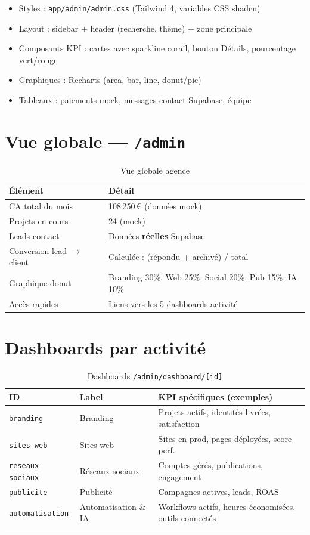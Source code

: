 \documentclass[11pt,a4paper]{report}
\begin{document}
\begin{itemize}[leftmargin=*]
  \item Styles : \texttt{app/admin/admin.css} (Tailwind 4, variables CSS shadcn)
  \item Layout : sidebar + header (recherche, thème) + zone principale
  \item Composants KPI : cartes avec sparkline corail, bouton Détails, pourcentage vert/rouge
  \item Graphiques : Recharts (area, bar, line, donut/pie)
  \item Tableaux : paiements mock, messages contact Supabase, équipe
\end{itemize}

\section{Vue globale — \texttt{/admin}}

\begin{table}[h]
\centering
\begin{tabular}{@{}lp{9cm}@{}}
\toprule
\textbf{Élément} & \textbf{Détail} \\
\midrule
CA total du mois & 108\,250\,€ (données mock) \\
Projets en cours & 24 (mock) \\
Leads contact & Données \textbf{réelles} Supabase \\
Conversion lead $\rightarrow$ client & Calculée : (répondu + archivé) / total \\
Graphique donut & Branding 30\%, Web 25\%, Social 20\%, Pub 15\%, IA 10\% \\
Accès rapides & Liens vers les 5 dashboards activité \\
\bottomrule
\end{tabular}
\caption{Vue globale agence}
\end{table}

\section{Dashboards par activité}

\begin{longtable}{@{}llp{7cm}@{}}
\toprule
\textbf{ID} & \textbf{Label} & \textbf{KPI spécifiques (exemples)} \\
\midrule
\endhead
\texttt{branding} & Branding & Projets actifs, identités livrées, satisfaction \\
\texttt{sites-web} & Sites web & Sites en prod, pages déployées, score perf. \\
\texttt{reseaux-sociaux} & Réseaux sociaux & Comptes gérés, publications, engagement \\
\texttt{publicite} & Publicité & Campagnes actives, leads, ROAS \\
\texttt{automatisation} & Automatisation \& IA & Workflows actifs, heures économisées, outils connectés \\
\bottomrule
\caption{Dashboards \texttt{/admin/dashboard/[id]}}
\end{longtable}
\end{document}
